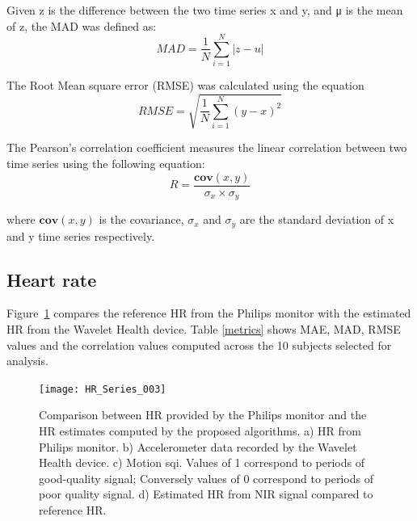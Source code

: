 Given z is the difference between the two time series x and y, and μ is the mean of z, the MAD was defined as:
\begin{equation}
MAD = \frac{1}{N}\sum_{i=1}^{N} |z-u|
\end{equation}

The Root Mean square error (RMSE) was calculated using the equation
\begin{equation}
RMSE = \sqrt{\frac{1}{N}\sum_{i=1}^{N} (y-x)^{2}}
\end{equation}

The Pearson's correlation coefficient measures the linear correlation between two time series using the following equation:
\begin{equation}
R = \frac{\mathbf{cov}(x, y)}{\sigma_{x} \times \sigma_{y}}
\end{equation}

where $\mathbf{cov}(x, y)$ is the covariance, $\sigma_{x}$ and $\sigma_{y}$ are the standard deviation of x and y time series respectively. 
  
 \subsection{Heart rate}
 
 Figure~\ref{HRseries} compares the reference HR from the Philips monitor with the estimated HR from the Wavelet Health device. Table \ref{metrics} shows MAE, MAD, RMSE values and the correlation values computed across the 10 subjects selected for analysis. 


\begin{figure}[!ht]
\centering
\texttt{[image: HR\_Series\_003]}
    \caption[Comparison between HR provided by the Philips monitor and the HR estimates computed by the proposed algorithms.]{Comparison between HR provided by the Philips monitor and the HR estimates computed by the proposed algorithms. a) HR from Philips monitor. b) Accelerometer data recorded by the Wavelet Health device. c) Motion \gls{sqi}. Values of 1 correspond to periods of good-quality signal; Conversely values of 0 correspond to periods of poor quality signal. d) Estimated HR from NIR signal compared to reference HR.}
    \label{HRseries}
    \end{figure}


